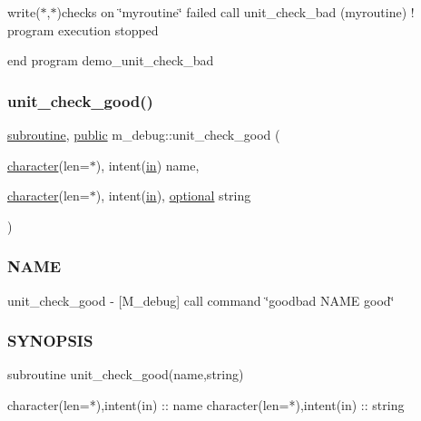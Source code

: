 write($\ast$,$\ast$)\textquotesingle{}checks on \char`\"{}myroutine\char`\"{} failed\textquotesingle{} call unit\+\_\+check\+\_\+bad (\textquotesingle{}myroutine\textquotesingle{}) ! program execution stopped

end program demo\+\_\+unit\+\_\+check\+\_\+bad \mbox{\label{namespacem__debug_acd67428a8900ec4c36bd3a7b28d56987}} 
\subsubsection{\texorpdfstring{unit\+\_\+check\+\_\+good()}{unit\_check\_good()}}
{\footnotesize\ttfamily \hyperlink{M__stopwatch_83_8txt_acfbcff50169d691ff02d4a123ed70482}{subroutine}, \hyperlink{M__stopwatch_83_8txt_a2f74811300c361e53b430611a7d1769f}{public} m\+\_\+debug\+::unit\+\_\+check\+\_\+good (\begin{DoxyParamCaption}\item[{\hyperlink{option__stopwatch_83_8txt_abd4b21fbbd175834027b5224bfe97e66}{character}(len=$\ast$), intent(\hyperlink{M__journal_83_8txt_afce72651d1eed785a2132bee863b2f38}{in})}]{name,  }\item[{\hyperlink{option__stopwatch_83_8txt_abd4b21fbbd175834027b5224bfe97e66}{character}(len=$\ast$), intent(\hyperlink{M__journal_83_8txt_afce72651d1eed785a2132bee863b2f38}{in}), \hyperlink{option__stopwatch_83_8txt_aa4ece75e7acf58a4843f70fe18c3ade5}{optional}}]{string }\end{DoxyParamCaption})}



\subsubsection*{N\+A\+ME}

unit\+\_\+check\+\_\+good -\/ \mbox{[}M\+\_\+debug\mbox{]} call command \char`\"{}goodbad N\+A\+M\+E good\char`\"{} 

\subsubsection*{S\+Y\+N\+O\+P\+S\+IS}

\begin{DoxyVerb}subroutine unit_check_good(name,string)

 character(len=*),intent(in) :: name
 character(len=*),intent(in) :: string
\end{DoxyVerb}



